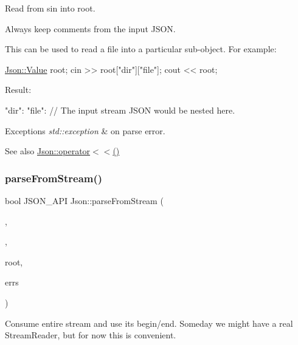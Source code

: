 Read from \textquotesingle{}sin\textquotesingle{} into \textquotesingle{}root\textquotesingle{}. 

Always keep comments from the input J\+S\+ON.

This can be used to read a file into a particular sub-\/object. For example\+: 
\begin{DoxyCode}
\hyperlink{classJson_1_1Value}{Json::Value} root;
cin >> root[\textcolor{stringliteral}{"dir"}][\textcolor{stringliteral}{"file"}];
cout << root;
\end{DoxyCode}
 Result\+: \begin{DoxyVerb}{
"dir": {
    "file": {
    // The input stream JSON would be nested here.
    }
}
}
\end{DoxyVerb}
 
\begin{DoxyExceptions}{Exceptions}
{\em std\+::exception} & on parse error. \\
\hline
\end{DoxyExceptions}
\begin{DoxySeeAlso}{See also}
\hyperlink{namespaceJson_a975d1dbca8aa7a06f38d373edcb9081c}{Json\+::operator$<$$<$()} 
\end{DoxySeeAlso}
\mbox{\label{namespaceJson_aab0cf1ecf81d1aeca12be2a416a84352}} 
\subsubsection{\texorpdfstring{parse\+From\+Stream()}{parseFromStream()}}
{\footnotesize\ttfamily bool J\+S\+O\+N\+\_\+\+A\+PI Json\+::parse\+From\+Stream (\begin{DoxyParamCaption}\item[{\hyperlink{classJson_1_1CharReader_1_1Factory}{Char\+Reader\+::\+Factory} const \&}]{,  }\item[{J\+S\+O\+N\+C\+P\+P\+\_\+\+I\+S\+T\+R\+E\+AM \&}]{,  }\item[{\hyperlink{classJson_1_1Value}{Value} $\ast$}]{root,  }\item[{std\+::string $\ast$}]{errs }\end{DoxyParamCaption})}

Consume entire stream and use its begin/end. Someday we might have a real Stream\+Reader, but for now this is convenient. 